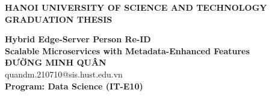 \documentclass[main.tex]{subfiles}
\begin{document}
\begin{titlepage}
\thispagestyle{empty}
\begin{center}

{\textbf{\large{HANOI UNIVERSITY OF SCIENCE AND TECHNOLOGY}}}\\[4cm]

{\textbf{\huge{ GRADUATION THESIS}}}\\[1cm]
{\textbf{\Large{Hybrid Edge-Server Person Re-ID\\
Scalable Microservices with Metadata-Enhanced Features}}\\[1cm]

{\textbf{\large{ĐƯỜNG MINH QUÂN}}}\\
{\large{quandm.210710@sis.hust.edu.vn}}\\[0.5cm]

{\textbf{\large{Program: Data Science (IT-E10) }}}\\


\vspace{2cm}
\begin{table}[H]
\centering
{}
\end{table}}
\end{center}



\end{titlepage}
\end{document}
